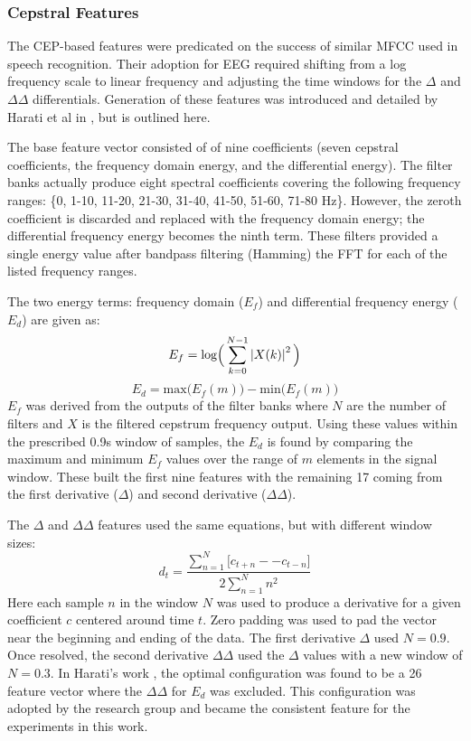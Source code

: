 \subsubsection{Cepstral Features}

The \ac{CEP}-based features were predicated on the success of similar \ac{MFCC} used in speech recognition. Their adoption for \ac{EEG} required shifting from a log frequency scale to linear frequency and adjusting the time windows for the $\Delta$ and $\Delta\Delta$ differentials. Generation of these features was introduced and detailed by Harati et al in \cite{Harati2015a}, but is outlined here.

The base feature vector consisted of of nine coefficients (seven cepstral coefficients, the frequency domain energy, and the differential energy). The filter banks actually produce eight spectral coefficients covering the following frequency ranges: \{0, 1-10, 11-20, 21-30, 31-40, 41-50, 51-60, 71-80 Hz\}. However, the zeroth coefficient is discarded and replaced with the frequency domain energy; the differential frequency energy becomes the ninth term. These filters provided a single energy value after bandpass filtering (Hamming) the \ac{FFT} for each of the listed frequency ranges.

The two energy terms: frequency domain ($E_{f}$) and differential frequency energy ($E_{d}$) are given as:
\begin{equation}
E_{f} = \text{log}\Big( \sum_{k=0}^{N-1}\left | {X(k)} \right |^2 \Big)
\end{equation}
\begin{equation}
E_{d} = \text{max}\Big( E_{f}(m) \Big) - \text{min} \Big( E_{f}(m) \Big)
\end{equation}
$E_{f}$ was derived from the outputs of the filter banks where $N$ are the number of filters and $X$ is the filtered cepstrum frequency output. Using these values within the prescribed 0.9s window of samples, the $E_{d}$ is found by comparing the maximum and minimum $E_{f}$ values over the range of $m$ elements in the signal window. These built the first nine features with the remaining 17 coming from the first derivative ($\Delta$) and second derivative ($\Delta\Delta$).

The $\Delta$ and $\Delta\Delta$ features used the same equations, but with different window sizes:
\begin{equation}
d_{t} = \frac{\sum_{n=1}^{N}\big[ c_{t+n}--c_{t-n} \big]}{2\sum_{n=1}^{N}n^{2}}
\end{equation}
Here each sample $n$ in the window $N$ was used to produce a derivative for a given coefficient $c$ centered around time $t$. Zero padding was used to pad the vector near the beginning and ending of the data. The first derivative $\Delta$ used $N=0.9$. Once resolved, the second derivative $\Delta\Delta$ used the $\Delta$ values with a new window of $N=0.3$. In Harati's work \cite{Harati2015a}, the optimal configuration was found to be a 26 feature vector where the $\Delta\Delta$ for $E_{d}$ was excluded. This configuration was adopted by the research group and became the consistent feature for the experiments in this work.

